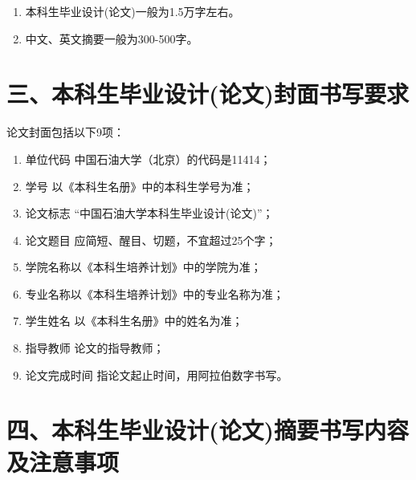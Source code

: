 \documentclass{cupb-thesis}
\begin{document}
\begin{enumerate}[label=\arabic*.]
  \item 本科生毕业设计(论文)一般为1.5万字左右。
  \item 中文、英文摘要一般为300-500字。
\end{enumerate}
\section{三、本科生毕业设计(论文)封面书写要求}

论文封面包括以下9项：

\begin{enumerate}[label=（\arabic*）]
  \item 单位代码    中国石油大学（北京）的代码是11414；
  \item 学号        以《本科生名册》中的本科生学号为准；
  \item 论文标志    “中国石油大学本科生毕业设计(论文)”；
  \item 论文题目    应简短、醒目、切题，不宜超过25个字；
  \item 学院名称以《本科生培养计划》中的学院为准；
  \item 专业名称以《本科生培养计划》中的专业名称为准；
  \item 学生姓名    以《本科生名册》中的姓名为准；
  \item 指导教师    论文的指导教师；
  \item 论文完成时间    指论文起止时间，用阿拉伯数字书写。
\end{enumerate}
\section{四、本科生毕业设计(论文)摘要书写内容及注意事项}
\end{document}
